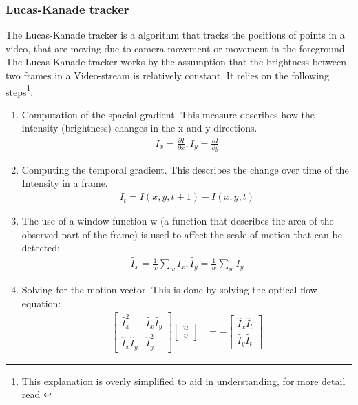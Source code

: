 \documentclass[11pt,a4paper]{article}
\begin{document}
\subsubsection{Lucas-Kanade tracker} \label{Sec:Lucas-Kanade}
The Lucas-Kanade tracker is a algorithm that tracks the positions of points in a video, that are moving due to camera movement or movement in the foreground.
The Lucas-Kanade tracker works by the assumption that the brightness between two frames in a Video-stream is relatively constant. 
It relies on the following steps\footnote{This explanation is overly simplified to aid in understanding, for more detail read \cite{lucas1981iterative}}:
\begin{enumerate}
    \item Computation of the spacial gradient. This measure describes how the intensity (brightness) changes in the x and y directions.
        \begin{align*}
            I_x = \frac {\partial I} {\partial x}, I_y = \frac {\partial I} {\partial y}
        \end{align*}
    \item Computing the temporal gradient. This describes the change over time of the Intensity in a frame.
        \begin{align*}
            I_t =  I(x,y,t+1) - I(x,y,t) 
        \end{align*}
    \item The use of a window function w (a function that describes the area of the observed part of the frame) is used to affect the scale of motion that can be detected:
        \begin{align*}
            \hat I_x = \frac 1 w \sum_w I_x, \hat I_y = \frac 1 w \sum_w I_y
        \end{align*}
    \item Solving for the motion vector. This is done by solving the optical flow equation: 
        \begin{align*}
           \begin{bmatrix}
               \hat I_x^2 & \hat I_x \hat I_y \\  \hat I_x \hat I_y & \hat I_y^2
           \end{bmatrix} 
           \begin{bmatrix}
                u \\ v 
           \end{bmatrix}
           &= - \begin{bmatrix}
                \hat I_x \hat I_t \\ \hat I_y \hat I_t 

\end{bmatrix}
\end{align*}
\end{enumerate}
\end{document}
